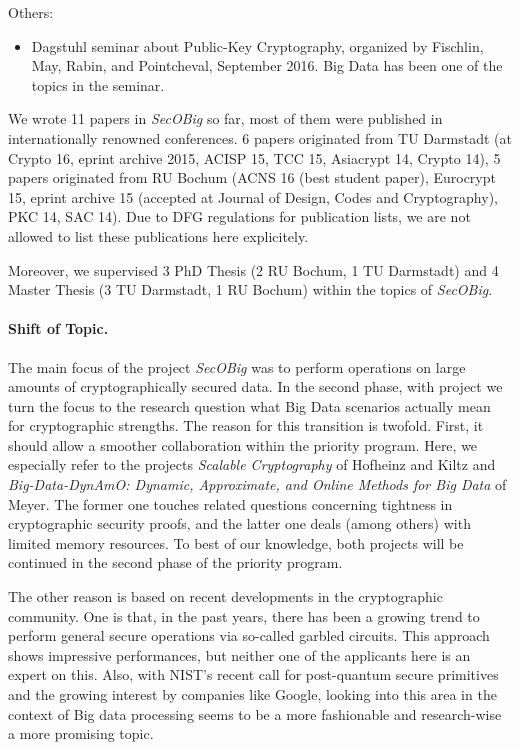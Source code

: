 \vspace*{-0.3cm}
\noindent
Others:
\vspace*{-0.3cm}
\begin{itemize}
\item Dagstuhl seminar about Public-Key Cryptography, organized by Fischlin, May, Rabin, and Pointcheval, September 2016. Big Data has been one of the topics in the seminar.
\end{itemize}
\fi

We wrote 11 papers in \emph{SecOBig} so far, most of them were published in internationally renowned conferences.  6 papers originated from TU Darmstadt (at Crypto 16, eprint archive 2015, ACISP 15, TCC 15, Asiacrypt 14, Crypto 14), 5 papers originated from RU Bochum (ACNS 16 (best student paper), Eurocrypt 15, eprint archive 15 (accepted at Journal of Design, Codes and Cryptography), PKC 14, SAC 14). Due to DFG regulations for publication lists, we are not allowed to list these publications here explicitely.

Moreover, we supervised 3 PhD Thesis (2 RU Bochum, 1 TU Darmstadt) and 4 Master Thesis (3 TU Darmstadt, 1 RU Bochum) within the topics of \emph{SecOBig}.

\paragraph{Shift of Topic.}
The main focus of the project \emph{SecOBig} was to perform operations on large amounts of cryptographically secured data. In the second phase, with project \emph{\memoc} we turn the focus to the research question what Big Data scenarios actually mean for cryptographic strengths. The reason for this transition is twofold. First, it should allow a smoother collaboration within the priority program. Here, we especially refer to the projects \emph{Scalable Cryptography} of Hofheinz and Kiltz and \emph{Big-Data-DynAmO: Dynamic, Approximate, and Online Methods for Big Data} of Meyer. The former one touches related questions concerning tightness in cryptographic security proofs, and the latter one deals (among others) with limited memory resources. To best of our knowledge, both projects will be continued in the second phase of the priority program.

The other reason is based on recent developments in the cryptographic community. One is that, in the past years, there has been a growing trend to perform general secure operations via so-called garbled circuits. This approach shows impressive performances, but neither one of the applicants here is an expert on this. Also, with NIST's recent call for post-quantum secure primitives and the growing interest by companies like Google, looking into this area in the context of Big data processing seems to be a more fashionable and research-wise a more promising topic.


